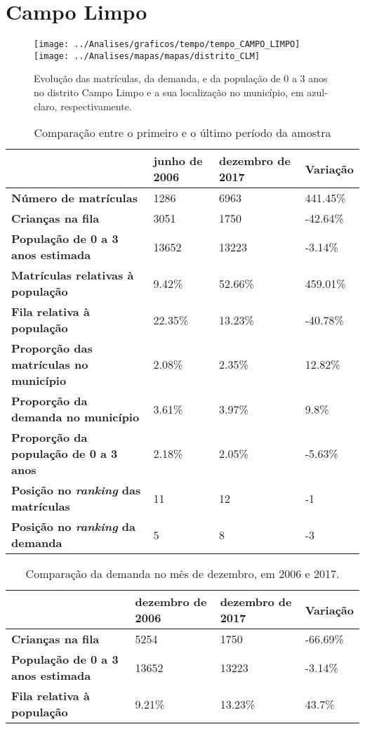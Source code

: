 \section{Campo Limpo}
\begin{figure}[H]
\centering
\texttt{[image: ../Analises/graficos/tempo/tempo\_CAMPO\_LIMPO]}
\texttt{[image: ../Analises/mapas/mapas/distrito\_CLM]}
\caption{Evolução das matrículas, da demanda, e da população de 0 a 3 anos no distrito Campo Limpo e a sua localização no município, em azul-claro, respectivamente.}
\end{figure}
\begin{table}[H]
\begin{tabular}{l|l|l|l}
\textbf{}                                      & \textbf{junho de 2006}       & \textbf{dezembro de 2017}    & \textbf{Variação} \\ \hline
\textbf{Número de matrículas}                  & 1286 & 6963 & 441.45\% \\ \hline
\textbf{Crianças na fila}                      & 3051 & 1750 & -42.64\% \\ \hline
\textbf{População de 0 a 3 anos estimada}      & 13652 & 13223 & -3.14\% \\ \hline
\textbf{Matrículas relativas à população}      & 9.42\% & 52.66\% & 459.01\% \\ \hline
\textbf{Fila relativa à população}             & 22.35\% & 13.23\% & -40.78\% \\ \hline
\textbf{Proporção das matrículas no município} & 2.08\% & 2.35\% & 12.82\% \\ \hline
\textbf{Proporção da demanda no município}     & 3.61\% & 3.97\% & 9.8\% \\ \hline
\textbf{Proporção da população de 0 a 3 anos}  & 2.18\% & 2.05\% & -5.63\% \\ \hline
\textbf{Posição no \textit{ranking} das matrículas}     & 11 & 12 & -1 \\ \hline
\textbf{Posição no \textit{ranking} da demanda}         & 5 & 8 & -3 \\ 
\end{tabular}
\caption{Comparação entre o primeiro e o último período da amostra}
\end{table}
\begin{table}[H]
\begin{tabular}{l|l|l|l}
\textbf{}                                 & \textbf{dezembro de 2006} & \textbf{dezembro de 2017} & \textbf{Variação} \\ \hline
\textbf{Crianças na fila}                      & 5254 & 1750 & -66.69\% \\ \hline
\textbf{População de 0 a 3 anos estimada}      & 13652 & 13223 & -3.14\% \\ \hline
\textbf{Fila relativa à população}             & 9.21\% & 13.23\% & 43.7\% \\
\end{tabular}
\caption{Comparação da demanda no mês de dezembro, em 2006 e 2017.}
\end{table}
